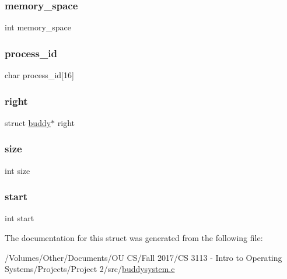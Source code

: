 \mbox{\label{structbuddy_a3da34b9c9f29cee0a0e7006f2f860c22}} 
\subsubsection{\texorpdfstring{memory\+\_\+space}{memory\_space}}
{\footnotesize\ttfamily int memory\+\_\+space}

\mbox{\label{structbuddy_ac7a4d007b168a6e4bbbe35881c60a477}} 
\subsubsection{\texorpdfstring{process\+\_\+id}{process\_id}}
{\footnotesize\ttfamily char process\+\_\+id\mbox{[}16\mbox{]}}

\mbox{\label{structbuddy_a028e12f4d275e9ff96ca3cc8599fc1da}} 
\subsubsection{\texorpdfstring{right}{right}}
{\footnotesize\ttfamily struct \hyperlink{structbuddy}{buddy}$\ast$ right}

\mbox{\label{structbuddy_a439227feff9d7f55384e8780cfc2eb82}} 
\subsubsection{\texorpdfstring{size}{size}}
{\footnotesize\ttfamily int size}

\mbox{\label{structbuddy_a37722a150250e2a5a98e5e0d11e53449}} 
\subsubsection{\texorpdfstring{start}{start}}
{\footnotesize\ttfamily int start}



The documentation for this struct was generated from the following file\+:\begin{DoxyCompactItemize}
\item 
/\+Volumes/\+Other/\+Documents/\+O\+U C\+S/\+Fall 2017/\+C\+S 3113 -\/ Intro to Operating Systems/\+Projects/\+Project 2/src/\hyperlink{buddysystem_8c}{buddysystem.\+c}\end{DoxyCompactItemize}
